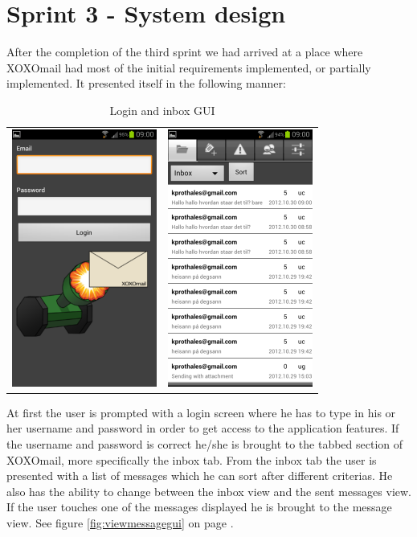 \section{Sprint 3 - System design}
After the completion of the third sprint we had arrived at a place where XOXOmail had most of the initial requirements implemented, or partially implemented. It presented itself in the following manner:
\newline
\newline
\begin{table}[h!]
\begin{center}
\begin{tabular}{cc}
\includegraphics{logingui} & \includegraphics{inbox}
\end{tabular}
\end{center}
\caption{Login and inbox GUI} \label{tab:logininboxgui}
\end{table}

At first the user is prompted with a login screen where he has to type in his or her username and password in order to get access to the application features. If the username and password is correct he/she is brought to the tabbed section of XOXOmail, more specifically the inbox tab. From the inbox tab the user is presented with a list of messages which he can sort after different criterias. He also has the ability to change between the inbox view and the sent messages view. If the user touches one of the messages displayed he is brought to the message view. See figure \ref{fig:viewmessagegui} on page \pageref{fig:viewmessagegui}.
\newline


